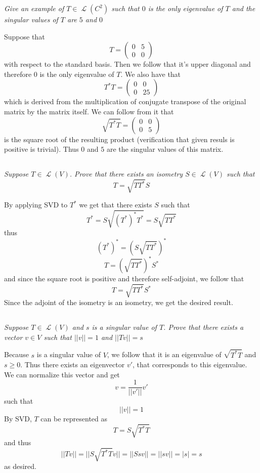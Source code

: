 \documentclass[11pt,oneside,titlepage]{book}
\DeclareMathOperator \map {\mathcal {L}}
\begin{document}
\textit{Give an example of $T \in \map(C^2)$ such that $0$ is the only eigenvalue of $T$ and
  the singular values of $T$ are $5$ and $0$}

Suppose that
$$T =
\begin{pmatrix}
  0 & 5 \\
  0 & 0
\end{pmatrix}
$$
with respect to the standard basis.
Then we follow that it's upper diagonal and therefore 0 is the only eigenvalue of $T$.
We also have that 
$$T^* T =
\begin{pmatrix}
  0 & 0 \\
  0 & 25
\end{pmatrix}
$$
which is derived from the multiplication of conjugate transpose of the original matrix
by the matrix itself. We can follow from it that
$$\sqrt{T^* T} =
\begin{pmatrix}
  0 & 0 \\
  0 & 5
\end{pmatrix}
$$
is the square root of the resulting product (verification that given resuls is positive is
trivial). Thus $0$ and $5$ are the singular values of this matrix.

\subsection{}

\textit{Suppose $T \in \map(V)$. Prove that there exists an isometry $S \in \map(V)$ such that 
  $$T = \sqrt{T T^*} S$$
}

By applying SVD to  $T^*$ we get that there exists $S$ such that
$$T^* = S \sqrt{(T^*)^* T^*} = S \sqrt{T T^*}$$
thus
$$(T^*)^*= (S \sqrt{T T^*})^* $$
$$T= (\sqrt{T T^*})^* S^* $$
and since the square root is positive and therefore self-adjoint, we follow that 
$$T= \sqrt{T T^*} S^* $$
Since the adjoint of the isometry is an isometry, we get the desired result.

\subsection{}

\textit{Suppose $T \in \map(V)$ and $s$ is a singular value of $T$. Prove that there exists
  a vector $v \in V$ such that $||v|| = 1$ and $||Tv|| = s$}

Because $s$ is a singular value of $V$, we follow that it is an eigenvalue of $\sqrt{T^* T}$
and $s \geq 0$.
Thus there exists an eigenvector $v'$, that corresponds to this eigenvalue. We can normalize
this vector and get
$$v = \frac{1}{||v'||}v' $$
such that
$$||v|| = 1$$
By SVD, $T$ can be represented as
$$T = S \sqrt{T^* T}$$
and thus
$$||Tv|| = ||S \sqrt{T^* T} v|| = ||S sv|| = ||s v|| = |s| = s$$
as desired.
\end{document}
